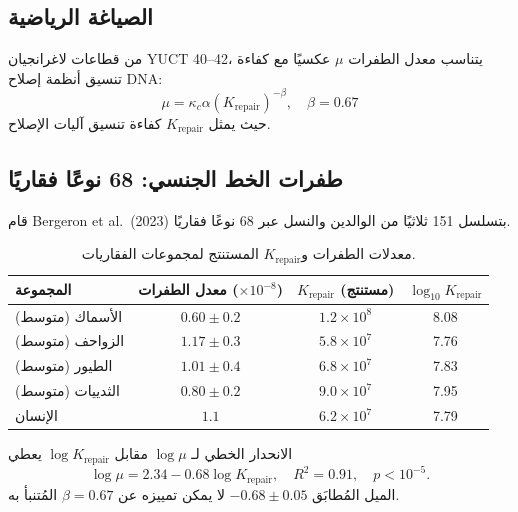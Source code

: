 \documentclass[11pt,a4paper]{article}
\begin{document}
	\subsection{الصياغة الرياضية}
	
	من قطاعات لاغرانجيان YUCT 40--42، يتناسب معدل الطفرات \(\mu\) عكسيًا مع كفاءة تنسيق أنظمة إصلاح DNA:
	\begin{equation}
		\mu = \kappa_c \alpha \left(K_{\text{repair}}\right)^{-\beta}, \quad \beta = 0.67
		\label{eq:mutation-rate}
	\end{equation}
	حيث يمثل \(K_{\text{repair}}\) كفاءة تنسيق آليات الإصلاح.
	
	\subsection{طفرات الخط الجنسي: 68 نوعًا فقاريًا}
	
	قام Bergeron et al.\ (2023) بتسلسل 151 ثلاثيًا من الوالدين والنسل عبر 68 نوعًا فقاريًا.
	
	\begin{table}[H]
		\centering
		\caption{معدلات الطفرات و\(K_{\text{repair}}\) المستنتج لمجموعات الفقاريات.}
		\label{tab:vertebrate-mutations}
		\begin{tabular}{lccc}
			\toprule
			\textbf{المجموعة} & \textbf{معدل الطفرات (\(\times 10^{-8}\))} & \textbf{\(K_{\text{repair}}\) (مستنتج)} & \(\log_{10} K_{\text{repair}}\) \\
			\midrule
			الأسماك (متوسط) & \(0.60 \pm 0.2\) & \(1.2 \times 10^8\) & 8.08 \\
			الزواحف (متوسط) & \(1.17 \pm 0.3\) & \(5.8 \times 10^7\) & 7.76 \\
			الطيور (متوسط) & \(1.01 \pm 0.4\) & \(6.8 \times 10^7\) & 7.83 \\
			الثدييات (متوسط) & \(0.80 \pm 0.2\) & \(9.0 \times 10^7\) & 7.95 \\
			الإنسان & \(1.1\) & \(6.2 \times 10^7\) & 7.79 \\
			\bottomrule
		\end{tabular}
	\end{table}
	
	الانحدار الخطي لـ \(\log \mu\) مقابل \(\log K_{\text{repair}}\) يعطي
	\begin{equation}
		\log \mu = 2.34 - 0.68 \log K_{\text{repair}}, \quad R^2 = 0.91, \quad p < 10^{-5}.
		\label{eq:mutation-fit}
	\end{equation}
	الميل المُطابَق \(-0.68 \pm 0.05\) لا يمكن تمييزه عن \(\beta = 0.67\) المُتنبأ به.
	
\end{document}
